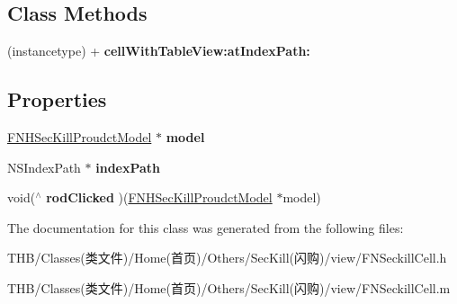 \subsection*{Class Methods}
\begin{DoxyCompactItemize}
\item 
\mbox{\label{interface_f_n_seckill_cell_ae816728b7e542b8279bba83ea7550542}} 
(instancetype) + {\bfseries cell\+With\+Table\+View\+:at\+Index\+Path\+:}
\end{DoxyCompactItemize}
\subsection*{Properties}
\begin{DoxyCompactItemize}
\item 
\mbox{\label{interface_f_n_seckill_cell_ac69af83edf49e9d4a1b5d6f02f59b303}} 
\mbox{\hyperlink{interface_f_n_h_sec_kill_proudct_model}{F\+N\+H\+Sec\+Kill\+Proudct\+Model}} $\ast$ {\bfseries model}
\item 
\mbox{\label{interface_f_n_seckill_cell_a76517c524fa8f1a798653bd4b95b59ed}} 
N\+S\+Index\+Path $\ast$ {\bfseries index\+Path}
\item 
\mbox{\label{interface_f_n_seckill_cell_a29c0d08991006e91a5bbe9ba191eb3ab}} 
void($^\wedge$ {\bfseries rod\+Clicked} )(\mbox{\hyperlink{interface_f_n_h_sec_kill_proudct_model}{F\+N\+H\+Sec\+Kill\+Proudct\+Model}} $\ast$model)
\end{DoxyCompactItemize}


The documentation for this class was generated from the following files\+:\begin{DoxyCompactItemize}
\item 
T\+H\+B/\+Classes(类文件)/\+Home(首页)/\+Others/\+Sec\+Kill(闪购)/view/F\+N\+Seckill\+Cell.\+h\item 
T\+H\+B/\+Classes(类文件)/\+Home(首页)/\+Others/\+Sec\+Kill(闪购)/view/F\+N\+Seckill\+Cell.\+m\end{DoxyCompactItemize}
